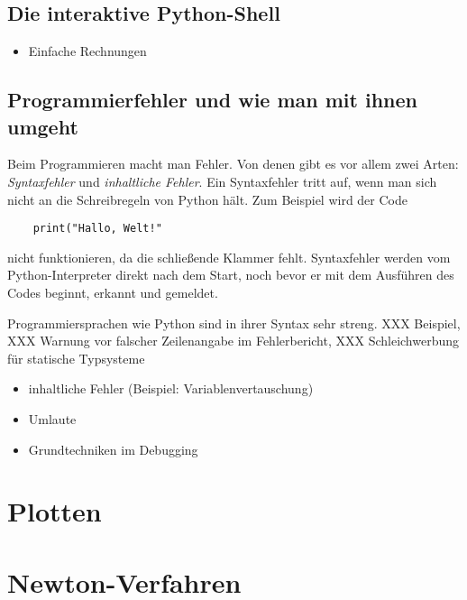 \documentclass{blatt}
\begin{document}
\subsection{Die interaktive Python-Shell}

\begin{itemize}
\item Einfache Rechnungen
\end{itemize}


\subsection{Programmierfehler und wie man mit ihnen umgeht}

Beim Programmieren macht man Fehler. Von denen gibt es vor allem zwei Arten:
\emph{Syntaxfehler} und \emph{inhaltliche Fehler}. Ein Syntaxfehler tritt auf,
wenn man sich nicht an die Schreibregeln von Python hält. Zum Beispiel wird der
Code
\begin{verbatim}
    print("Hallo, Welt!"
\end{verbatim}
nicht funktionieren, da die schließende Klammer fehlt. Syntaxfehler werden vom
Python-Interpreter direkt nach dem Start, noch bevor er mit dem Ausführen des
Codes beginnt, erkannt und gemeldet.

Programmiersprachen wie Python sind in ihrer Syntax sehr streng. XXX Beispiel,
XXX Warnung vor falscher Zeilenangabe im Fehlerbericht, XXX Schleichwerbung für
statische Typsysteme

\begin{itemize}
\item inhaltliche Fehler (Beispiel: Variablenvertauschung)
\item Umlaute
\item Grundtechniken im Debugging
\end{itemize}


\section{Plotten}


\section{Newton-Verfahren}
\end{document}
